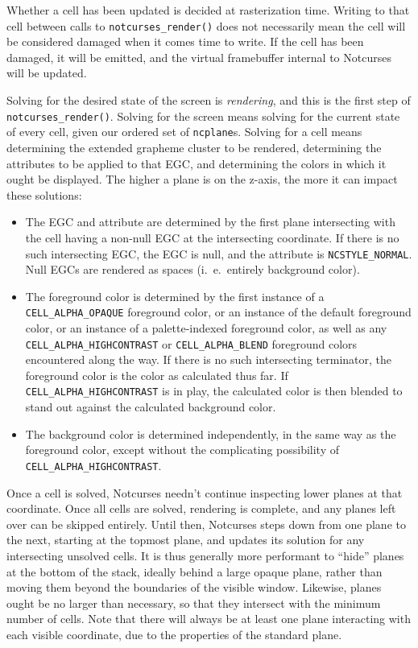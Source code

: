 \documentclass[letterpaper,10pt]{article}
\newenvironment{denseitemize}{
  \begin{itemize}
      \setlength{\itemsep}{0pt}
}{
  \end{itemize}
}
\begin{document}
Whether a cell has been updated is decided at rasterization time. Writing to
that cell between calls to \texttt{notcurses\_render()} does not necessarily
mean the cell will be considered damaged when it comes time to write. If the
cell has been damaged, it will be emitted, and the virtual framebuffer internal
to Notcurses will be updated.

Solving for the desired state of the screen is \textit{rendering}, and this is
the first step of \texttt{notcurses\_render()}. Solving for the screen means
solving for the current state of every cell, given our ordered set of
\texttt{ncplane}s. Solving for a cell means determining the extended grapheme
cluster to be rendered, determining the attributes to be applied to that EGC,
and determining the colors in which it ought be displayed. The higher a plane
is on the z-axis, the more it can impact these solutions:

\begin{denseitemize}
\item{The EGC and attribute are determined by the first plane intersecting with
      the cell having a non-null EGC at the intersecting coordinate. If there is
    no such intersecting EGC, the EGC is null, and the attribute is
    \texttt{NCSTYLE\_NORMAL}.} Null EGCs are rendered as spaces (i.\ e.\ entirely
    background color).
\item{The foreground color is determined by the first instance of a
    \texttt{CELL\_ALPHA\_OPAQUE} foreground color, or an instance of the
    default foreground color, or an instance of a palette-indexed foreground
    color, as well as any \texttt{CELL\_ALPHA\_HIGHCONTRAST} or \texttt{CELL\_ALPHA\_BLEND}
    foreground colors encountered along the way. If there is no such
    intersecting terminator, the foreground color is the color as calculated
    thus far. If \texttt{CELL\_ALPHA\_HIGHCONTRAST} is in play, the calculated
    color is then blended to stand out against the calculated background
    color.}
\item{The background color is determined independently, in the same way as the
    foreground color, except without the complicating possibility of
    \texttt{CELL\_ALPHA\_HIGHCONTRAST}.}
\end{denseitemize}

Once a cell is solved, Notcurses needn't continue inspecting lower planes at
that coordinate. Once all cells are solved, rendering is complete, and any
planes left over can be skipped entirely. Until then, Notcurses steps down from
one plane to the next, starting at the topmost plane, and updates its solution
for any intersecting unsolved cells. It is thus generally more performant to
``hide'' planes at the bottom of the stack, ideally behind a large opaque plane,
rather than moving them beyond the boundaries of the visible window. Likewise,
planes ought be no larger than necessary, so that they intersect with the
minimum number of cells. Note that there will always be at least one plane
interacting with each visible coordinate, due to the properties of the standard
plane.
\end{document}
